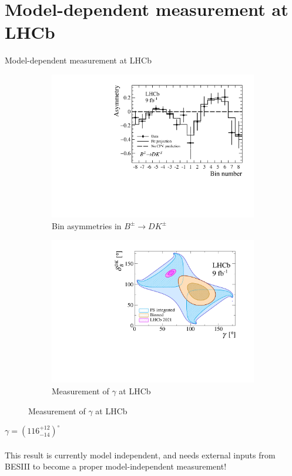 \documentclass{beamer}
\begin{document}
\section{Model-dependent measurement at LHCb}
\begin{frame}{Model-dependent measurement at LHCb}
  \begin{figure}
    \centering
    \begin{subfigure}{0.50\textwidth}
      \centering
      \includegraphics[width=1.0\textwidth]{Plots/BinAsymmetries_dk.pdf}
      \caption{Bin asymmetries in $B^\pm\to DK^\pm$}
    \end{subfigure}%
    \begin{subfigure}{0.50\textwidth}
      \centering
      \includegraphics[width=1.0\textwidth,trim={0 0.15cm 0 0},clip=true]{Plots/gammacharm_lhcb_KKpipi_GLW_KKpipi_GGSZ_lhcb_2020_beauty_and_charm_g_d_dk.pdf}
      \caption{Measurement of $\gamma$ at LHCb}
    \end{subfigure}
  \end{figure}
  \begin{center}
    $\gamma = (116^{+12}_{-14})^\circ$\\~\\
    This result is currently model independent, and needs external inputs from BESIII to become a proper model-independent measurement!
  \end{center}
\end{frame}
\end{document}
